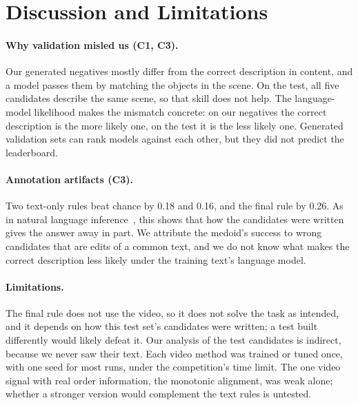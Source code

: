 \documentclass[10pt,twocolumn]{article}
\newcommand{\cha}[1]{\textsf{C#1}}
\begin{document}
\section{Discussion and Limitations}

\paragraph{Why validation misled us (\cha1, \cha3).} Our generated negatives mostly differ from the correct
description in content, and a model passes them by matching the objects in the scene. On the test, all five
candidates describe the same scene, so that skill does not help. The language-model likelihood makes the mismatch
concrete: on our negatives the correct description is the more likely one, on the test it is the less likely one.
Generated validation sets can rank models against each other, but they did not predict the leaderboard.

\paragraph{Annotation artifacts (\cha3).} Two text-only rules beat chance by 0.18 and 0.16, and the final rule
by 0.26. As in natural language inference~\cite{gururangan2018artifacts,poliak2018hypothesis}, this shows that how the
candidates were written gives the answer away in part. We attribute the medoid's success to wrong candidates that
are edits of a common text, and we do not know what makes the correct description less likely under the training
text's language model.

\paragraph{Limitations.} The final rule does not use the video, so it does not solve the task as intended, and it
depends on how this test set's candidates were written; a test built differently would likely defeat it. Our
analysis of the test candidates is indirect, because we never saw their text. Each video method was trained or
tuned once, with one seed for most runs, under the competition's time limit. The one video signal with real order
information, the monotonic alignment, was weak alone; whether a stronger version would complement the text rules
is untested.

\end{document}
